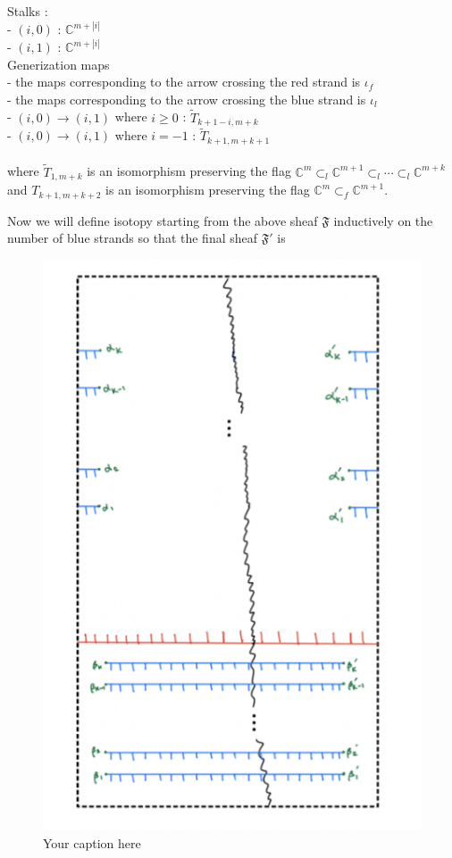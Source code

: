 Stalks :\\
- $(i,0)$ : $\mathbb{C}^{m+|i|}$\\
- $(i,1)$ : $\mathbb{C}^{m+|i|}$\\

Generization maps\\
- the maps corresponding to the arrow crossing the red strand is $\iota_f$\\
- the maps corresponding to the arrow crossing the blue strand is $\iota_l$\\
- $(i,0)\rightarrow (i,1)$ where $i\geq 0$ : $\tilde{T}_{k+1-i,m+k}$\\
- $(i,0)\rightarrow (i,1)$ where $i=-1$ : $\tilde{T}_{k+1,m+k+1}$\\
\\
where $\tilde{T}_{1,m+k}$ is an isomorphism preserving the flag $\mathbb{C}^m\subset_l \mathbb{C}^{m+1}\subset_l \cdots \subset_l \mathbb{C}^{m+k}$ and $T_{k+1,m+k+2}$ is an isomorphism preserving the flag $\mathbb{C}^m \subset_f \mathbb{C}^{m+1}$.

Now we will define isotopy starting from the above sheaf $\mathfrak{F}$ inductively on the number of blue strands so that the final sheaf $\mathfrak{F}'$ is
\begin{figure}[H] %
    \centering
    \includegraphics[scale = 0.95]{diagrams/definition6/2.png} %
    \caption{Your caption here}
    \label{fig:your-label}
\end{figure}

